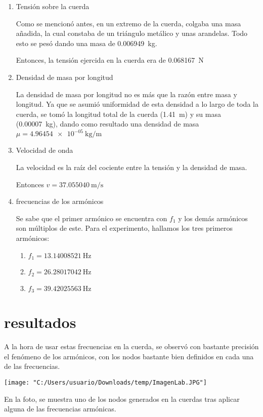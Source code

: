 \documentclass{article}
\begin{document}
\begin{enumerate}
    \item Tensión sobre la cuerda
    
        Como se mencionó antes, en un extremo de la cuerda, colgaba una
        masa añadida, la cual constaba de un triángulo metálico y
        unas arandelas. Todo esto se pesó dando una masa de \qty{0.006949}{\kilogram}.

        Entonces, la tensión ejercida en la cuerda era de \qty{0.068167}{\newton}

    \item Densidad de masa por longitud
    
    La densidad de masa por longitud no es más que la razón entre masa y longitud.
    Ya que se asumió uniformidad de esta densidad a lo largo de toda la cuerda,
    se tomó la longitud total de la cuerda (\qty{1.41}{\metre}) y su masa
    (\qty{0.00007}{\kilogram}), dando como resultado una densidad de masa
    $\mu = \qty[per-mode=symbol]{4.96454e-05}{\kilogram\per\metre}$

    \item Velocidad de onda
    
    La velocidad es la raíz del cociente entre la tensión y la densidad
    de masa. 
    
    Entonces $v = \qty[per-mode=symbol]{37.055040}{\metre\per\s}$

    \item frecuencias de los armónicos
    
    Se sabe que el primer armónico se encuentra con $f_1$ y los demás
    armónicos son múltiplos de este. Para el experimento, hallamos los
    tres primeros armónicos:

    \begin{enumerate}
        \item $f_1 = \qty{13.14008521}{\hertz}$
        \item $f_2 = \qty{26.28017042}{\hertz}$
        \item $f_3 = \qty{39.42025563}{\hertz}$
    \end{enumerate}
\end{enumerate}


\section{resultados}

A la hora de usar estas frecuencias en la cuerda, se observó con bastante
precisión el fenómeno de los armónicos, con los nodos bastante bien
definidos en cada una de las frecuencias.

\begin{center}
    \texttt{[image: "C:/Users/usuario/Downloads/temp/ImagenLab.JPG"]}
\end{center}

En la foto, se muestra uno de los nodos generados en la cuerdas tras aplicar
alguna de las frecuencias armónicas.
\end{document}
